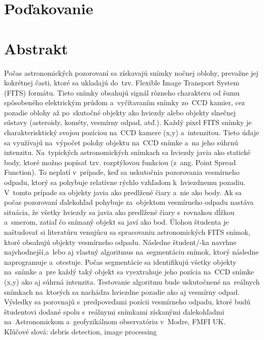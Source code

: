\documentclass[12pt, a4paper, oneside]{book}
\begin{document}
\chapter*{Poďakovanie}\label{chap:thank_you}
\vfill\eject

\chapter*{Abstrakt}\label{chap:abstract_sk}
Počas astronomických pozorovaní sa získavajú snímky nočnej oblohy, prevažne jej kokrétnej časti, ktoré sa ukladajú do tzv. Flexible Image Transport System (FITS) formátu. Tieto snímky obsahujú signál rôzneho charakteru od šumu spôsobeného elektrickým prúdom a vyčítavaním snímky zo CCD kamier, cez pozadie oblohy až po skutočné objekty ako hviezdy alebo objekty slnečnej sústavy (asteroidy, kométy, vesmírny odpad, atď.). Každý pixel FITS snímky je charakterisktický svojou pozíciou na CCD kamere (x,y) a intenzitou. Tieto údaje sa využívajú na výpočet polohy objektu na CCD snímke a na jeho súhrnú intenzitu.
Na typických astronomických snímkach sa hviezdy javia ako statické body, ktoré možno popísať tzv. rozptýlovou funkciou (z ang. Point Spread Function). To neplatí v prípade, keď sa uskutočnia pozorovania vesmírneho odpadu, ktorý sa pohybuje relatívne rýchlo vzhľadom k hviezdnemu pozadiu. V tomto prípade sa objekty javia ako predlžené čiary a nie ako body. Ak sa počas pozorovaní ďalekohľad pohybuje za objektom vesmírneho odpadu nastáva situácia, že všetky hviezdy sa javia ako predlžené čiary s rovnakou dĺžkou a smerom, zatiaľ čo snímaný objekt sa javí ako bod.
Úlohou študenta je naštudovať si literatúru venujúcu sa spracovaniu astronomických FITS snímok, ktoré obsahujú objekty vesmírneho odpadu. Následne študent/-ka navrhne najvhodnejší,a lebo aj vlastný algoritmus na segmentáciu snímok, ktorý následne naprogramuje a otestuje. Počas segmentácie sa identifikujú všetky objekty na snímke a pre každý taký objekt sa vyextrahuje jeho pozícia na CCD snímke (x,y) ako aj súhrná intenzita. Testovanie algoritmu bude uskutočnené na reálnych snímkach na ktorých sa nachádza hviezdne pozadie ako aj vesmírny odpad. Výsledky sa porovnajú s predpoveďami pozícii vesmírneho odpadu, ktoré budú študentovi dodané spolu s reálnymi snímkami získanými ďalekohľadmi na Astronomickom a geofyzikálnom observatóriu v Modre, FMFI UK.
~\\
Kľúčové slová: debris detection, image processing
\vfill\eject
\end{document}
